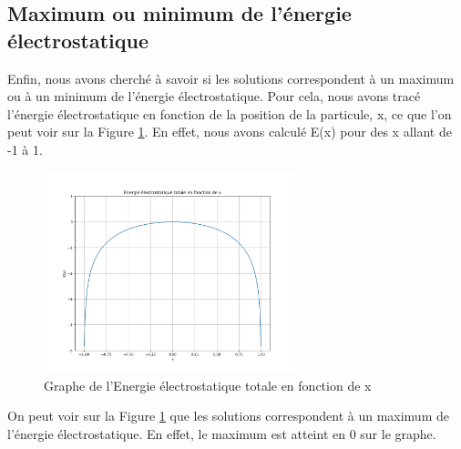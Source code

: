 \subsection{Maximum ou minimum de l'énergie électrostatique}
Enfin, nous avons cherché à savoir si les solutions correspondent à un maximum ou à un minimum de l'énergie électrostatique.
Pour cela, nous avons tracé l'énergie électrostatique en fonction de la position de la particule, x, ce que l'on peut 
voir sur la Figure \ref{fig:p2-c-2}. En effet, nous avons calculé E(x) pour des x allant de -1 à 1. 
\begin{figure}[htbp!]
    \centering
    \includegraphics[width=0.65\textwidth]{res/part2_max_min.png}
    \caption{Graphe de l'Energie électrostatique totale en fonction de x}
    \label{fig:p2-c-2}
\end{figure} 
On peut voir sur la Figure \ref{fig:p2-c-2} que les solutions correspondent à un maximum de l'énergie électrostatique. 
En effet, le maximum est atteint en 0 sur le graphe.